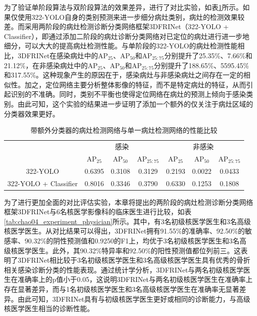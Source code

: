 为了验证单阶段算法与双阶段算法的效果差异，进行了对比实验，如表\ref{tab:chao04_experiment_1vs2}所示。如果仅使用322-YOLO自身的类别预测来进一步细分病灶类别，病灶的检测效果较差。而采用两阶段的病灶检测诊断分类网络框架3DFRINet（322-YOLO + Classifier），即通过添加二阶段的病灶诊断分类网络对已定位的病灶进行进一步地细分，可以大大的提高病灶检测性能。与单阶段的322-YOLO的病灶检测性能相比，3DFRINet在感染病灶中的AP\(_{25}\)、AP\(_{50}\)和AP\(_{25:75}\)分别提升了25.35\%、7.66\%和21.12\%，在非感染病灶中的AP\(_{25}\)、AP\(_{50}\)和AP\(_{25:75}\)分别提升了188.65\%、5595.45\%和317.55\%。这种现象产生的原因在于，感染病灶与非感染病灶之间存在一定的相似性。加之，定位网络主要分析整体影像的特征，而不是特定病灶的特征，从而引起识别的不准确。同时，类别不平衡也使得定位网络在病灶的预测上倾向于感染类别。由此可知，这个实验的结果进一步证明了添加一个额外的仅关注于病灶区域的分类器效果更好。

\begin{table}[htbp]
  \centering
  \caption{带额外分类器的病灶检测网络与单一病灶检测网络的性能比较}
  \begin{tabular}{ccccccc}
    \toprule
                          & \multicolumn{3}{c}{感染} & \multicolumn{3}{c}{非感染}                                                               \\
                          & AP\(_{25}\)              & AP\(_{50}\)                & AP\(_{25:75}\) & AP\(_{25}\) & AP\(_{50}\) & AP\(_{25:75}\) \\
    \midrule
    322-YOLO              & 0.6395                   & 0.3108                     & 0.3129         & 0.2193      & 0.0022      & 0.0433         \\
    322-YOLO + Classifier & 0.8016                   & 0.3346                     & 0.3790         & 0.6330      & 0.1253      & 0.1808         \\
    \bottomrule
  \end{tabular}
  \label{tab:chao04_experiment_1vs2}
\end{table}

为了进行更加全面的对比评估实验，本章将提出的两阶段的病灶检测诊断分类网络框架3DFRINet与6名核医学影像科的临床医生进行比较，如表\ref{tab:chao04_experiment_physician}所示。其中，有3名初级核医学医生和3名高级核医学医生。从对比结果可以得出，3DFRINet拥有91.55\%的准确率、92.50\%的敏感率、90.32\%的阴性预测值和0.9250的F1上，均优于3名初级核医学医生和3名高级核医学医生。此外，其90.32\%特异率和92.50\%的阳性预测值都位列前三。这表明了3DFRINet相比较于3名初级核医学医生和3名高级核医学医生具有优秀的骨折相关感染诊断分类的性能表现。通过统计学分析，3DFRINet与两名初级核医学医生在准确率上的p值小于0.05，这说明3DFRINet与两名初级核医学医生在准确率上存在显著差异，而与1名初级核医学医生和3名高级核医学医生在准确率无显著差异。由此可知，3DFRINet具有与初级核医学医生更好或相同的诊断能力，与高级核医学医生相当的诊断性能。

